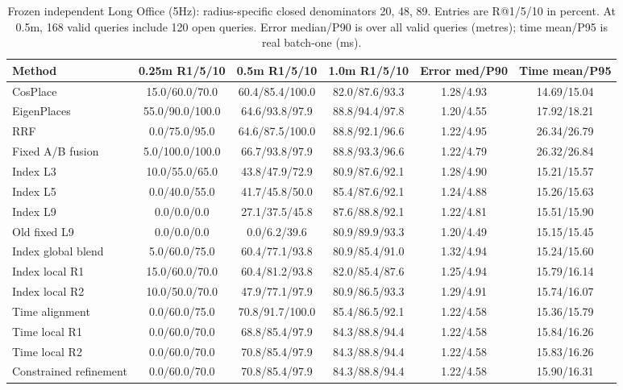 \documentclass[conference,letterpaper]{IEEEtran}
\begin{document}
\begin{table}[t]
\centering\caption{Frozen independent Long Office (5Hz): radius-specific closed denominators 20, 48, 89. Entries are R@1/5/10 in percent. At 0.5m, 168 valid queries include 120 open queries. Error median/P90 is over all valid queries (metres); time mean/P95 is real batch-one (ms).}
\label{tab:test}
\scriptsize\setlength{\tabcolsep}{5pt}
\begin{tabular}{lccccc}\hline
Method & 0.25m R1/5/10 & 0.5m R1/5/10 & 1.0m R1/5/10 & Error med/P90 & Time mean/P95\\\hline
CosPlace & 15.0/60.0/70.0 & 60.4/85.4/100.0 & 82.0/87.6/93.3 & 1.28/4.93 & 14.69/15.04 \\
EigenPlaces & 55.0/90.0/100.0 & 64.6/93.8/97.9 & 88.8/94.4/97.8 & 1.20/4.55 & 17.92/18.21 \\
RRF & 0.0/75.0/95.0 & 64.6/87.5/100.0 & 88.8/92.1/96.6 & 1.22/4.95 & 26.34/26.79 \\
Fixed A/B fusion & 5.0/100.0/100.0 & 66.7/93.8/97.9 & 88.8/93.3/96.6 & 1.22/4.79 & 26.32/26.84 \\
Index L3 & 10.0/55.0/65.0 & 43.8/47.9/72.9 & 80.9/87.6/92.1 & 1.28/4.90 & 15.21/15.57 \\
Index L5 & 0.0/40.0/55.0 & 41.7/45.8/50.0 & 85.4/87.6/92.1 & 1.24/4.88 & 15.26/15.63 \\
Index L9 & 0.0/0.0/0.0 & 27.1/37.5/45.8 & 87.6/88.8/92.1 & 1.22/4.81 & 15.51/15.90 \\
Old fixed L9 & 0.0/0.0/0.0 & 0.0/6.2/39.6 & 80.9/89.9/93.3 & 1.20/4.49 & 15.15/15.45 \\
Index global blend & 5.0/60.0/75.0 & 60.4/77.1/93.8 & 80.9/85.4/91.0 & 1.32/4.94 & 15.24/15.60 \\
Index local R1 & 15.0/60.0/70.0 & 60.4/81.2/93.8 & 82.0/85.4/87.6 & 1.25/4.94 & 15.79/16.14 \\
Index local R2 & 10.0/50.0/70.0 & 47.9/77.1/97.9 & 80.9/86.5/93.3 & 1.29/4.91 & 15.74/16.07 \\
Time alignment & 0.0/60.0/75.0 & 70.8/91.7/100.0 & 85.4/86.5/92.1 & 1.22/4.58 & 15.36/15.79 \\
Time local R1 & 0.0/60.0/70.0 & 68.8/85.4/97.9 & 84.3/88.8/94.4 & 1.22/4.58 & 15.84/16.26 \\
Time local R2 & 0.0/60.0/70.0 & 70.8/85.4/97.9 & 84.3/88.8/94.4 & 1.22/4.58 & 15.83/16.26 \\
Constrained refinement & 0.0/60.0/70.0 & 70.8/85.4/97.9 & 84.3/88.8/94.4 & 1.22/4.58 & 15.90/16.31 \\
\hline\end{tabular}\end{table}
\end{document}
